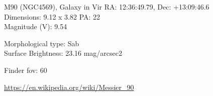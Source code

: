 \begin{block}{M90 (NGC4569), Galaxy in Vir}
    RA: 12:36:49.79, Dec: +13:09:46.6 \\ 
    Dimensions: 9.12 x 3.82 PA: 22 \\ 
    Magnitude (V): 9.54

    Morphological type: Sab \\ 
    Surface Brightness: 23.16 mag/arcsec2 


    Finder fov: 60 

    \url{https://en.wikipedia.org/wiki/Messier_90} 
\end{block}